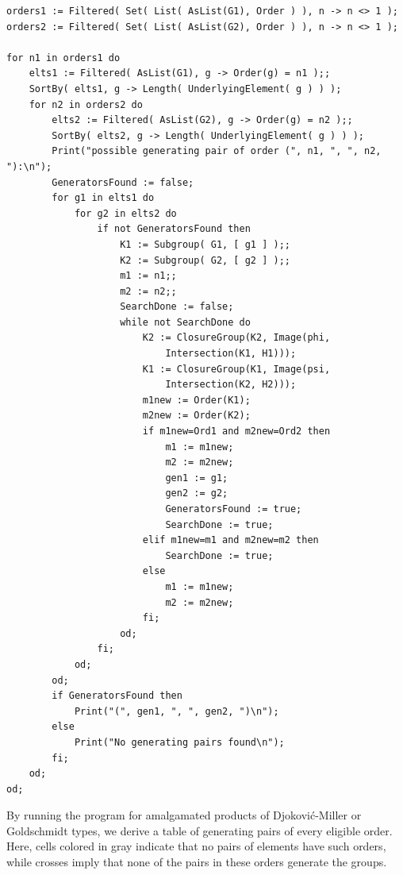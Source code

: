 \documentclass[12pt,leqno]{amsart}
\newcommand{\2}{L^2_{\rm per}(0, T)}
\numberwithin{equation}{section}
\numberwithin{figure}{section}
\begin{document}
\begin{verbatim}
orders1 := Filtered( Set( List( AsList(G1), Order ) ), n -> n <> 1 );
orders2 := Filtered( Set( List( AsList(G2), Order ) ), n -> n <> 1 );

for n1 in orders1 do
    elts1 := Filtered( AsList(G1), g -> Order(g) = n1 );;
    SortBy( elts1, g -> Length( UnderlyingElement( g ) ) ); 
    for n2 in orders2 do
        elts2 := Filtered( AsList(G2), g -> Order(g) = n2 );;
        SortBy( elts2, g -> Length( UnderlyingElement( g ) ) ); 
        Print("possible generating pair of order (", n1, ", ", n2, "):\n");
        GeneratorsFound := false;
        for g1 in elts1 do
            for g2 in elts2 do
                if not GeneratorsFound then
                    K1 := Subgroup( G1, [ g1 ] );;
                    K2 := Subgroup( G2, [ g2 ] );;
                    m1 := n1;;
                    m2 := n2;;
                    SearchDone := false;
                    while not SearchDone do
                        K2 := ClosureGroup(K2, Image(phi,
                            Intersection(K1, H1)));
                        K1 := ClosureGroup(K1, Image(psi, 
                            Intersection(K2, H2)));
                        m1new := Order(K1);
                        m2new := Order(K2);
                        if m1new=Ord1 and m2new=Ord2 then
                            m1 := m1new;
                            m2 := m2new;
                            gen1 := g1;
                            gen2 := g2;
                            GeneratorsFound := true;
                            SearchDone := true;
                        elif m1new=m1 and m2new=m2 then
                            SearchDone := true;
                        else
                            m1 := m1new;
                            m2 := m2new;
                        fi;
                    od;
                fi;
            od;
        od;
        if GeneratorsFound then
            Print("(", gen1, ", ", gen2, ")\n");
        else
            Print("No generating pairs found\n");
        fi;
    od;
od;
\end{verbatim}
By running the program for amalgamated products of Djokovi\'c-Miller or Goldschmidt types, we derive a table of generating pairs of every eligible order. Here, cells colored in gray indicate that no pairs of elements have such orders, while crosses imply that none of the pairs in these orders generate the groups.
\end{document}
